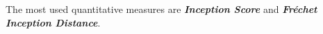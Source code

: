 
The most used quantitative measures are \textbf{\emph{Inception Score}} and \textbf{\emph{Fréchet Inception Distance}}.
